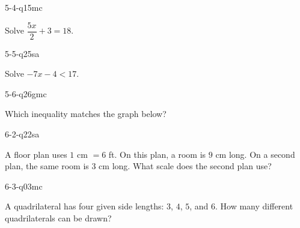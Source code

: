 \begin{practiceQuestion}{5-4-q15}{mc}
\begin{questionText}
Solve $\dfrac{5x}{2} + 3 = 18$.
\end{questionText}
\end{practiceQuestion}

\begin{practiceQuestion}{5-5-q25}{sa}
\begin{questionText}
Solve $-7x - 4 < 17$.
\end{questionText}
\end{practiceQuestion}

\begin{practiceQuestion}{5-6-q26}{gmc}
\begin{questionText}
Which inequality matches the graph below?

\begin{center}
\end{center}
\end{questionText}
\end{practiceQuestion}

\begin{practiceQuestion}{6-2-q22}{sa}
\begin{questionText}
A floor plan uses $1$ cm $= 6$ ft. On this plan, a room is $9$ cm long. On a second plan, the same room is $3$ cm long. What scale does the second plan use?
\end{questionText}
\end{practiceQuestion}

\begin{practiceQuestion}{6-3-q03}{mc}
\begin{questionText}
A quadrilateral has four given side lengths: $3$, $4$, $5$, and $6$. How many different quadrilaterals can be drawn?
\end{questionText}
\end{practiceQuestion}

